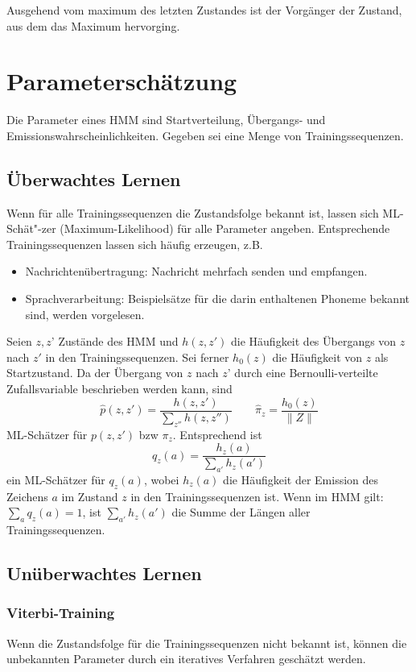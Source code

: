 Ausgehend vom maximum des letzten Zustandes ist der Vorgänger der Zustand, aus dem das Maximum hervorging.

\section{Parameterschätzung}
Die Parameter eines HMM sind Startverteilung, Übergangs- und Emissionswahrscheinlichkeiten.
Gegeben sei eine Menge von Trainingssequenzen.

\subsection{Überwachtes Lernen}
Wenn für alle Trainingssequenzen die Zustandsfolge bekannt ist, lassen sich ML-Schät"-zer (Maximum-Likelihood) für alle Parameter angeben.
Entsprechende Trainingssequenzen lassen sich häufig erzeugen, z.B.
\begin{itemize}
	\item Nachrichtenübertragung: Nachricht mehrfach senden und empfangen.
	\item Sprachverarbeitung: Beispielsätze für die darin enthaltenen Phoneme bekannt sind, werden vorgelesen.
\end{itemize}
Seien \(z,z\)' Zustände des HMM und \(h(z,z')\) die Häufigkeit des Übergangs von \(z\) nach \(z'\) in den Trainingssequenzen.
Sei ferner \(h_0(z)\) die Häufigkeit von \(z\) als Startzustand.
Da der Übergang von \(z\) nach \(z\)' durch eine Bernoulli-verteilte Zufallsvariable beschrieben werden kann, sind
\[
	\hat{p}(z,z')=\frac{h(z,z')}{\sum\limits_{z''} h(z,z'')} \qquad
	\hat\pi_z=\frac{h_0(z)}{\|Z\|}
\]
ML-Schätzer für \(p(z,z')\) bzw \(\pi_z\).
Entsprechend ist
\[
	\hat{q}_z(a)=\frac{h_z(a)}{\sum\limits_{a'} h_z(a')}
\]
ein ML-Schätzer für \(q_z(a)\), wobei \(h_z(a)\) die Häufigkeit der Emission des Zeichens \(a\) im Zustand \(z\) in den Trainingssequenzen ist.
Wenn im HMM gilt: \(\sum_a q_z(a)=1\), ist \(\sum_{a'} h_z(a')\) die Summe der Längen aller Trainingssequenzen.

\subsection{Unüberwachtes Lernen}
\subsubsection{Viterbi-Training}
Wenn die Zustandsfolge für die Trainingssequenzen nicht bekannt ist, können die unbekannten Parameter durch ein iteratives Verfahren geschätzt werden.


